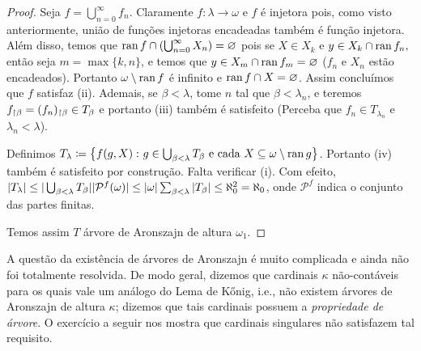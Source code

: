 \documentclass[a4paper]{article}
\begin{document}
\begin{proof}
   Seja \(f = \bigcup_{n = 0}^{\infty}f_n\). Claramente \(f\colon \lambda\to
   \omega\) e  \(f\)  é injetora pois, como visto anteriormente, união de
   funções injetoras  encadeadas também é função injetora. Além disso, temos que
   \(\operatorname{ran} f \cap (\bigcup_{n = 0}^{\infty} X_n)= \varnothing\) pois se \(X\in
   X_k\) e  \(y\in X_k\cap\operatorname{ran} f_n,\) então seja \(m=\max\{k,n\}\), e temos que
   \(y\in X_m\cap\operatorname{ran} f_m=\varnothing\) (\(f_n\) e \(X_n\) estão encadeados).
   Portanto  \(\omega\setminus\operatorname{ran} f\) é infinito e \(\operatorname{ran} f \cap X
   =\varnothing\). Assim concluímos que \(f\) satisfaz (ii). Ademais, se  \(\beta <
   \lambda\), tome \(n\) tal que \(\beta < \lambda_n\), e teremos
   \(f_{\upharpoonright \beta}= (f_{n})_{\upharpoonright \beta}\in T_\beta\) e portanto (iii)
   também é satisfeito (Perceba que \(f_n\in T_{\lambda_n}\) e \(\lambda_n<\lambda\)).
   
   Definimos \(T_\lambda\coloneqq\big\{f(g,X)\,\colon g\in\bigcup_{\beta <
     \lambda} T_{\beta} \text{ e cada } X \subseteq \omega\setminus\operatorname{ran}
   g\big\}\). Portanto  (iv) também é satisfeito por construção. Falta verificar
   (i). Com efeito,
   \(\vert T_\lambda \vert\leq\vert \bigcup_{\beta<\lambda}T_{\beta} \vert\vert \mathcal
     P^f(\omega) \vert \le \vert \omega \vert\sum_{\beta<\lambda}\vert T_{\beta} \vert
   \le \aleph_0^2=\aleph_0\), onde \(\mathcal P^f\) indica o conjunto das partes finitas.
   
   Temos assim \(T\) árvore de Aronszajn de altura \(\omega_1\).
\end{proof}

 A questão da existência de árvores de Aronszajn é muito complicada e ainda não
 foi totalmente resolvida. De modo geral, dizemos que cardinais \(\kappa\)
 não-contáveis para os quais vale um  análogo do Lema de Kőnig, i.e., não
 existem árvores  de Aronszajn de altura \(\kappa\); dizemos que tais cardinais
 possuem a  \textit{propriedade de árvore}. O exercício a seguir nos mostra que
 cardinais singulares não satisfazem tal requisito.
\end{document}
